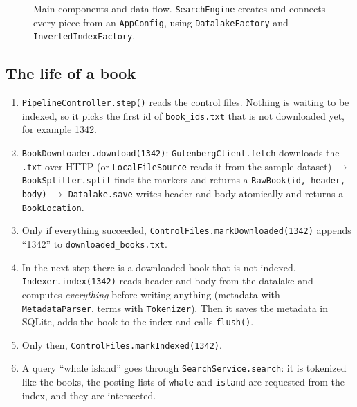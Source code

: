 \documentclass[11pt,a4paper]{article}
\newcommand{\code}[1]{\texttt{#1}}
\begin{document}
\begin{figure}[H]
\caption{Main components and data flow. \code{SearchEngine} creates and connects every piece from
an \code{AppConfig}, using \code{DatalakeFactory} and \code{InvertedIndexFactory}.}
\label{fig:components}
\end{figure}

\subsection{The life of a book}
\begin{enumerate}
  \item \code{PipelineController.step()} reads the control files. Nothing is waiting to be indexed,
        so it picks the first id of \code{book\_ids.txt} that is not downloaded yet, for example 1342.
  \item \code{BookDownloader.download(1342)}: \code{GutenbergClient.fetch} downloads the
        \code{.txt} over HTTP (or \code{LocalFileSource} reads it from the sample dataset) $\rightarrow$
        \code{BookSplitter.split} finds the markers and returns a \code{RawBook(id, header, body)}
        $\rightarrow$ \code{Datalake.save} writes header and body atomically and returns a
        \code{BookLocation}.
  \item Only if everything succeeded, \code{ControlFiles.markDownloaded(1342)} appends ``1342'' to
        \code{downloaded\_books.txt}.
  \item In the next step there is a downloaded book that is not indexed.
        \code{Indexer.index(1342)} reads header and body from the datalake and computes
        \emph{everything} before writing anything (metadata with \code{MetadataParser}, terms with
        \code{Tokenizer}). Then it saves the metadata in SQLite, adds the book to the index and
        calls \code{flush()}.
  \item Only then, \code{ControlFiles.markIndexed(1342)}.
  \item A query ``whale island'' goes through \code{SearchService.search}: it is tokenized like the
        books, the posting lists of \code{whale} and \code{island} are requested from the index, and
        they are intersected.
\end{enumerate}
\end{document}
